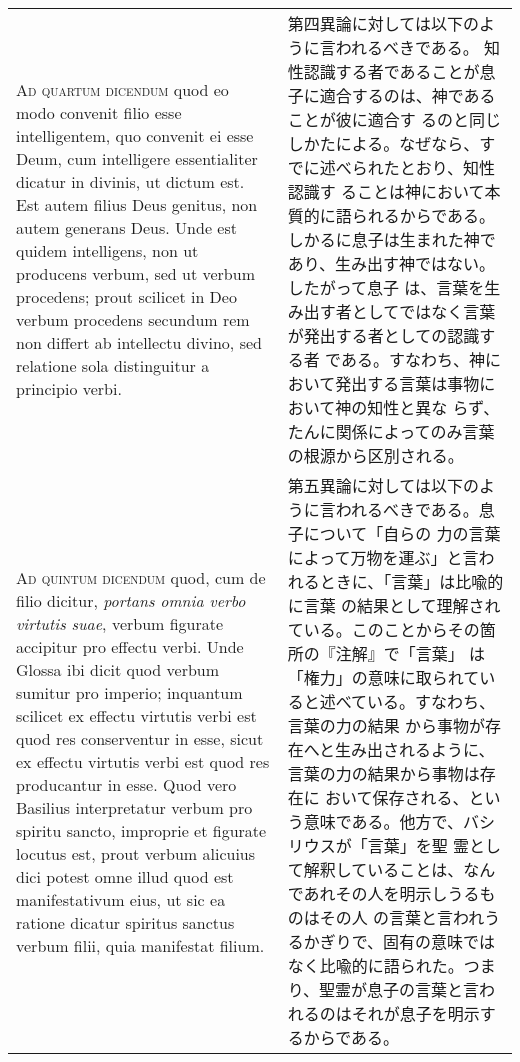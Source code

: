 \documentclass[10pt]{jsarticle} %
\begin{document}
\begin{longtable}{p{21em}p{21em}}
\\



{\scshape Ad quartum dicendum} quod eo modo convenit filio esse intelligentem,
quo convenit ei esse Deum, cum intelligere essentialiter dicatur in
divinis, ut dictum est. Est autem filius Deus genitus, non autem
generans Deus. Unde est quidem intelligens, non ut producens verbum,
sed ut verbum procedens; prout scilicet in Deo verbum procedens
secundum rem non differt ab intellectu divino, sed relatione sola
distinguitur a principio verbi.

&

第四異論に対しては以下のように言われるべきである。
知性認識する者であることが息子に適合するのは、神であることが彼に適合す
 るのと同じしかたによる。なぜなら、すでに述べられたとおり、知性認識す
 ることは神において本質的に語られるからである。
しかるに息子は生まれた神であり、生み出す神ではない。したがって息子
 は、言葉を生み出す者としてではなく言葉が発出する者としての認識する者
 である。すなわち、神において発出する言葉は事物において神の知性と異な
 らず、たんに関係によってのみ言葉の根源から区別される。

\\



{\scshape Ad quintum dicendum} quod, cum de filio dicitur, {\itshape portans omnia verbo
virtutis suae}, verbum figurate accipitur pro effectu verbi. Unde
Glossa ibi dicit quod verbum sumitur pro imperio; inquantum scilicet
ex effectu virtutis verbi est quod res conserventur in esse, sicut ex
effectu virtutis verbi est quod res producantur in esse. Quod vero
Basilius interpretatur verbum pro spiritu sancto, improprie et
figurate locutus est, prout verbum alicuius dici potest omne illud
quod est manifestativum eius, ut sic ea ratione dicatur spiritus
sanctus verbum filii, quia manifestat filium.

&

第五異論に対しては以下のように言われるべきである。息子について「自らの
 力の言葉によって万物を運ぶ」と言われるときに、「言葉」は比喩的に言葉
 の結果として理解されている。このことからその箇所の『注解』で「言葉」
 は「権力」の意味に取られていると述べている。すなわち、言葉の力の結果
 から事物が存在へと生み出されるように、言葉の力の結果から事物は存在に
 おいて保存される、という意味である。他方で、バシリウスが「言葉」を聖
 霊として解釈していることは、なんであれその人を明示しうるものはその人
 の言葉と言われうるかぎりで、固有の意味ではなく比喩的に語られた。つま
 り、聖霊が息子の言葉と言われるのはそれが息子を明示するからである。






\end{longtable}
\newpage
\end{document}
